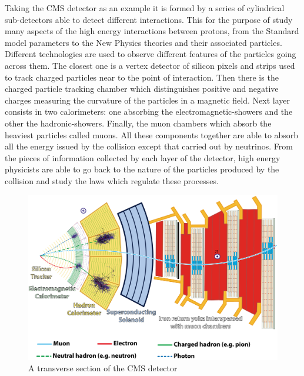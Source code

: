 Taking the CMS detector as an example it is formed by a series of cylindrical
sub-detectors able to detect different interactions. This for the purpose
of study many aspects of the high energy interactions between protons, from
the Standard model parameters to the New Physics theories and their
associated particles. Different technologies are used to observe different
features of the particles going across them. The closest one is a vertex
detector of silicon pixels and strips used to track charged particles near
to the point of interaction. Then there is the charged particle tracking
chamber which distinguishes positive and negative charges measuring the
curvature of the particles in a magnetic field. Next layer consists in two
calorimeters: one absorbing the electromagnetic-showers and the other the
hadronic-showers. Finally, the muon chambers which absorb the heaviest
particles called muons. All these components together are able to absorb
all the energy issued by the collision except that carried out by
neutrinos. From the pieces of information collected by each layer of the
detector, high energy physicists are able to go back to the nature of the
particles produced by the collision and study the laws which regulate these
processes.

\begin{figure}[H]
 \centering
 \includegraphics[scale=0.045]{figures/CMSslice.png}
 \caption{A transverse section of the CMS detector}
 \label{}
\end{figure}

